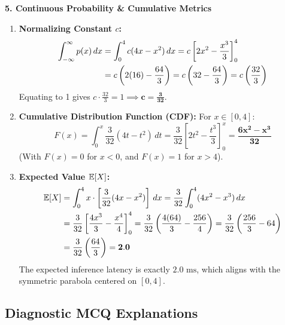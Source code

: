 \textbf{5. Continuous Probability \& Cumulative Metrics}
\begin{enumerate}
    \item \textbf{Normalizing Constant $c$:}
    \begin{align*}
    \int_{-\infty}^\infty p(x) \,dx &= \int_0^4 c(4x - x^2) \,dx = c \left[ 2x^2 - \frac{x^3}{3} \right]_0^4 \\
    &= c \left( 2(16) - \frac{64}{3} \right) = c \left( 32 - \frac{64}{3} \right) = c \left( \frac{32}{3} \right)
    \end{align*}
    Equating to 1 gives $c \cdot \frac{32}{3} = 1 \implies \mathbf{c = \frac{3}{32}}$.
    \item \textbf{Cumulative Distribution Function (CDF):} For $x \in [0, 4]$:
    \begin{equation*}
    F(x) = \int_0^x \frac{3}{32}(4t - t^2) \, dt = \frac{3}{32} \left[ 2t^2 - \frac{t^3}{3} \right]_0^x = \mathbf{\frac{6x^2 - x^3}{32}}
    \end{equation*}
    (With $F(x) = 0$ for $x < 0$, and $F(x) = 1$ for $x > 4$).
    \item \textbf{Expected Value $\mathbb{E}[X]$:}
    \begin{align*}
    \mathbb{E}[X] &= \int_0^4 x \cdot \left[ \frac{3}{32}(4x - x^2) \right] \,dx = \frac{3}{32} \int_0^4 (4x^2 - x^3) \,dx \\
    &= \frac{3}{32} \left[ \frac{4x^3}{3} - \frac{x^4}{4} \right]_0^4 = \frac{3}{32} \left( \frac{4(64)}{3} - \frac{256}{4} \right) = \frac{3}{32} \left( \frac{256}{3} - 64 \right) \\
    &= \frac{3}{32} \left( \frac{64}{3} \right) = \mathbf{2.0}
    \end{align*}
    The expected inference latency is exactly $2.0\text{ ms}$, which aligns with the symmetric parabola centered on $[0, 4]$.
\end{enumerate}

\subsection*{Diagnostic MCQ Explanations}


